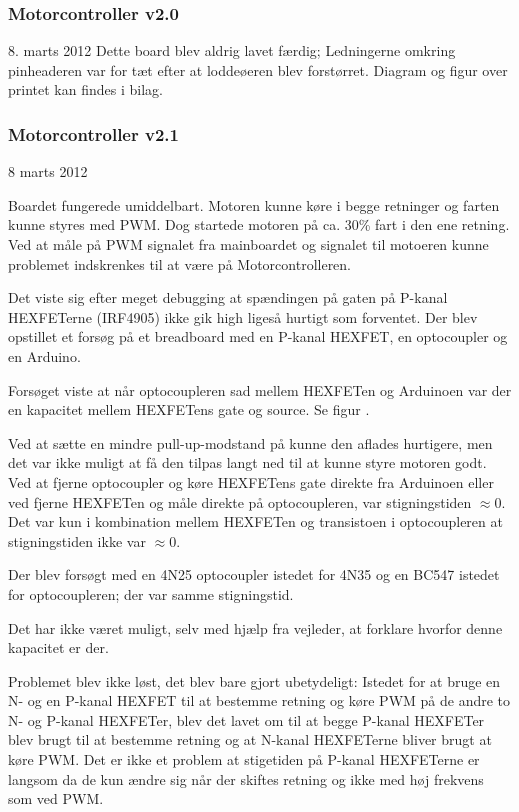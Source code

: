 \documentclass[a4paper,oneside,article,danish,table,draft]{memoir}
\newcommand{\boarddate}[1]{\textcolor{blue!80!black}{#1}}
\begin{document}
\subsubsection{Motorcontroller v2.0}
\boarddate{8. marts 2012} Dette board blev aldrig lavet færdig; Ledningerne omkring pinheaderen var for tæt efter at loddeøeren blev forstørret. Diagram og figur over printet kan findes i bilag. 

\subsubsection{Motorcontroller v2.1}
\boarddate{8 marts 2012}


Boardet fungerede umiddelbart. Motoren kunne køre i begge retninger og farten kunne styres med PWM. Dog startede motoren på ca. 30\% fart i den ene retning. Ved at måle på PWM signalet fra mainboardet og signalet til motoeren kunne problemet indskrenkes til at være på Motorcontrolleren.

Det viste sig efter meget debugging at spændingen på gaten på P-kanal HEXFETerne (IRF4905) ikke gik high ligeså hurtigt som forventet. Der blev opstillet et forsøg på et breadboard med en P-kanal HEXFET, en optocoupler og en Arduino.


Forsøget viste at når optocoupleren sad mellem HEXFETen og Arduinoen var der en kapacitet mellem HEXFETens gate og source. Se figur .

Ved at sætte en mindre pull-up-modstand på kunne den aflades hurtigere, men det var ikke muligt at få den tilpas langt ned til at kunne styre motoren godt. Ved at fjerne optocoupler og køre HEXFETens gate direkte fra Arduinoen eller ved fjerne HEXFETen og måle direkte på optocoupleren, var stigningstiden $\approx0$. Det var kun i kombination mellem HEXFETen og transistoen i optocoupleren at stigningstiden ikke var $\approx0$.

Der blev forsøgt med en 4N25 optocoupler istedet for 4N35 og en BC547 istedet for optocoupleren; der var samme stigningstid.

Det har ikke været muligt, selv med hjælp fra vejleder, at forklare hvorfor denne kapacitet er der.

Problemet blev ikke løst, det blev bare gjort ubetydeligt: Istedet for at bruge en N- og en P-kanal HEXFET til at bestemme retning og køre PWM på de andre to N- og P-kanal HEXFETer, blev det lavet om til at begge P-kanal HEXFETer blev brugt til at bestemme retning og at N-kanal HEXFETerne bliver brugt at køre PWM. Det er ikke et problem at stigetiden på P-kanal HEXFETerne er langsom da de kun ændre sig når der skiftes retning og ikke med høj frekvens som ved PWM.
\end{document}
